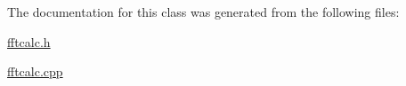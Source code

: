 The documentation for this class was generated from the following files\-:\begin{DoxyCompactItemize}
\item 
\hyperlink{fftcalc_8h}{fftcalc.\-h}\item 
\hyperlink{fftcalc_8cpp}{fftcalc.\-cpp}\end{DoxyCompactItemize}
